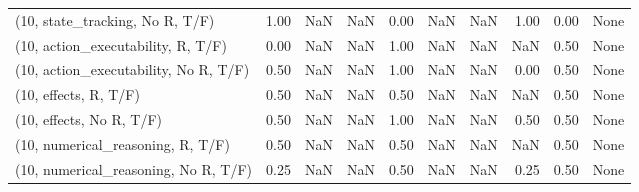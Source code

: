 \begin{table*}[h!]
\begin{adjustbox}{width=2\columnwidth,center}
\begin{tabular}{lrrr|rrr|rrr}
(10, state\_tracking, No R, T/F)       &                      1.00 &                   NaN &                       NaN &                          0.00 &                       NaN &                           NaN &                                   1.00 &                               0.00 &                                  None \\
(10, action\_executability, R, T/F)    &                      0.00 &                   NaN &                       NaN &                          1.00 &                       NaN &                           NaN &                                    NaN &                               0.50 &                                  None \\
(10, action\_executability, No R, T/F) &                      0.50 &                   NaN &                       NaN &                          1.00 &                       NaN &                           NaN &                                   0.00 &                               0.50 &                                  None \\
(10, effects, R, T/F)                 &                      0.50 &                   NaN &                       NaN &                          0.50 &                       NaN &                           NaN &                                    NaN &                               0.50 &                                  None \\
(10, effects, No R, T/F)              &                      0.50 &                   NaN &                       NaN &                          1.00 &                       NaN &                           NaN &                                   0.50 &                               0.50 &                                  None \\
(10, numerical\_reasoning, R, T/F)     &                      0.50 &                   NaN &                       NaN &                          0.50 &                       NaN &                           NaN &                                    NaN &                               0.50 &                                  None \\
(10, numerical\_reasoning, No R, T/F)  &                      0.25 &                   NaN &                       NaN &                          0.50 &                       NaN &                           NaN &                                   0.25 &                               0.50 &                                  None \\

\end{tabular}
\end{adjustbox}
\end{table*}
